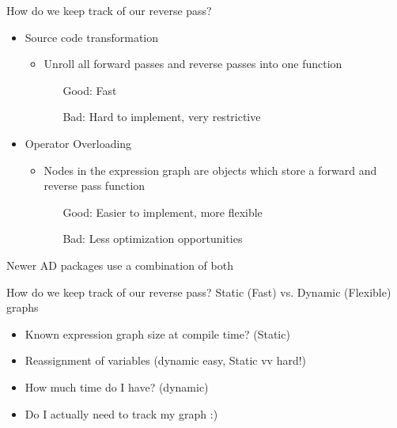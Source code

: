 \documentclass[dvipsnames]{beamer}
\begin{document}
\begin{frame}{How do we keep track of our reverse pass?}
\begin{itemize}
  \item Source code transformation
    \begin{itemize}
        \item Unroll all forward passes and reverse passes into one function
        \begin{itemize}
            \item[Good:] Fast
            \item[Bad:] Hard to implement, very restrictive
        \end{itemize}
    \end{itemize}
  \pause
    \item Operator Overloading
    \begin{itemize}
        \item Nodes in the expression graph are objects which store a forward and reverse pass function
        \begin{itemize}
          \item[Good:] Easier to implement, more flexible
          \item[Bad:] Less optimization opportunities
        \end{itemize}
    \end{itemize}
\end{itemize}
Newer AD packages use a combination of both
\end{frame}
\begin{frame}{How do we keep track of our reverse pass?}
Static (Fast) vs. Dynamic (Flexible) graphs
\begin{itemize}
\item Known expression graph size at compile time? (Static)
\item Reassignment of variables (dynamic easy, Static vv hard!)
\item How much time do I have? (dynamic)
\pause
\item Do I actually need to track my graph :)
\end{itemize}
\end{frame}
\end{document}
